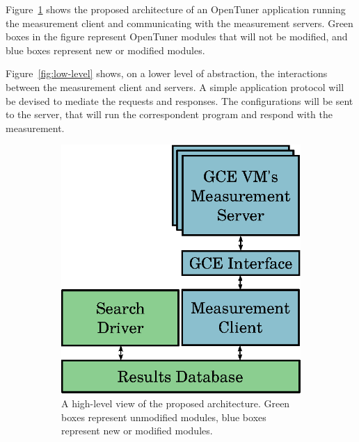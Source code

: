 \documentclass[a4paper, 12pt]{article}
\begin{document}
Figure~\ref{fig:high-level} shows the proposed architecture
of an OpenTuner application running the measurement
client and communicating with the measurement servers.
Green boxes in the figure represent OpenTuner modules
that will not be modified, and blue boxes represent
new or modified modules.

Figure~\ref{fig:low-level} shows, on a lower level
of abstraction, the interactions between the measurement
client and servers. A simple application protocol
will be devised to mediate the requests and responses.
The configurations will be sent to the server, that
will run the correspondent program and respond with
the measurement.

\begin{figure}[htpb]
    \centering
    \begin{subfigure}{.45\textwidth}
        \centering
        \includegraphics[scale=.62]{high-level-implementation}
        \caption{A high-level view of the proposed architecture.
        Green boxes represent unmodified modules, blue boxes represent
        new or modified modules.}
        \label{fig:high-level}
    \end{subfigure}%
    \hfill
    \begin{subfigure}{.45\textwidth}
        \centering

\end{subfigure}
\end{figure}
\end{document}
